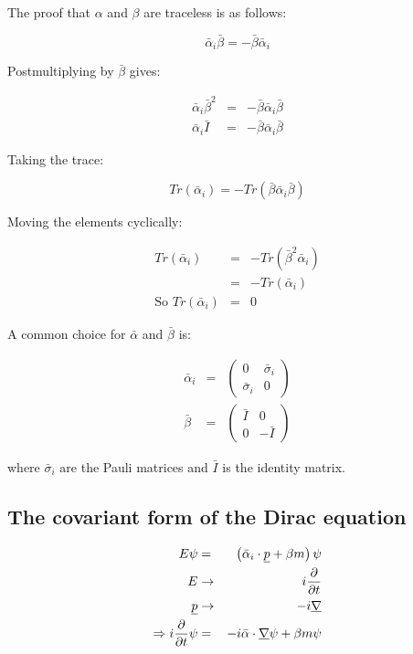 The proof that $\alpha$ and $\beta$ are traceless is as follows:

\[
  \bar{\alpha}_i\bar{\beta} = -\bar{\beta}\bar{\alpha}_i
\]

Postmultiplying by $\bar{\beta}$ gives:

\begin{eqnarray*}
  \bar{\alpha}_i\bar{\beta}^2 & = & -\bar{\beta}\bar{\alpha}_i\bar{\beta} \\
  \bar{\alpha}_i\bar{I} & = & -\bar{\beta}\bar{\alpha}_i\bar{\beta}
\end{eqnarray*}

Taking the trace:

\[
  Tr\left(\bar{\alpha}_i\right) = -Tr\left(\bar{\beta}\bar{\alpha}_i\bar{\beta}\right)
\]

Moving the elements cyclically:

\begin{eqnarray*}
  Tr\left(\bar{\alpha}_i\right) & = & - Tr\left(\bar{\beta}^2\bar{\alpha}_i\right) \\
  & = & - Tr\left(\bar{\alpha}_i\right) \\
  \textrm{So } Tr\left(\bar{\alpha}_i\right) & = & 0
\end{eqnarray*}

A common choice for $\bar{\alpha}$ and $\bar{\beta}$ is:

\begin{eqnarray*}
  \bar{\alpha}_i & = &
  \left(
    \begin{array}{cc}
    0 & \bar{\sigma}_i \\
    \bar{\sigma}_i & 0
    \end{array}
  \right)
  \\
  \bar{\beta} & = &
  \left(
    \begin{array}{cc}
    \bar{I} & 0 \\
    0 & -\bar{I}
    \end{array}
  \right)
\end{eqnarray*}

where $\bar{\sigma}_i$ are the Pauli matrices and $\bar{I}$ is the identity matrix.

\subsection{The covariant form of the Dirac equation}

\begin{eqnarray*}
  E\psi & = & \left(\bar{\alpha}_i\cdot\underline{p} + \beta m\right) \psi \\
  E & \to & i\frac{\partial}{\partial t} \\
  \underline{p} & \to & -i\underline{\nabla} \\
  \Rightarrow i\frac{\partial}{\partial t}\psi & = & -i \bar{\alpha}\cdot\underline{\nabla}\psi + \beta m\psi \\
\end{eqnarray*}

